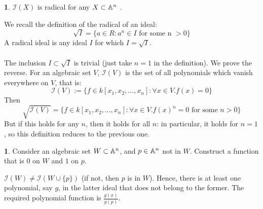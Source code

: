 \documentclass{book}
\newcommand{\I}[1]{\mathcal{I}(#1)}
\newcommand{\kn}{k[x_1,x_2,\ldots,x_n]}
\newcommand{\Af}{{\Bbb A}^n}
\theoremstyle{definition}
\theoremstyle{block}
\newtheorem{block*}[block]{}
\theoremstyle{thm}
\begin{document}
\begin{block*}$\I X$ is radical for any $X\subset\Af$ .\end{block*}
\noindent We recall the definition of the radical of an ideal:
\[\sqrt I = \{a\in R : a^n\in I \text{ for some n } > 0\}\]
A radical ideal is any ideal $I$ for which $I=\sqrt I$.\\\\
The inclusion $I\subset \sqrt I$ is trivial (just take $n=1$ in the definition).
We prove the reverse.
For an algebraic set $V$, $\I V$ is the set of all polynomials which vanish
everywhere on $V$, that is:
\[\I V:=\{f\in\kn : \forall x\in V. f(x) = 0\}\]
Then
\[\sqrt{\I V}=\{f\in\kn : \forall x\in V. f(x)^n = 0\text{ for some }n>0\}\]
But if this holds for any $n$, then it holds for all $n$: in particular, it
holds for $n=1$, so this definition reduces to the previous one.

\begin{block*}Consider an algebraic set $W\subset\Af$, and $p\in\Af$ not in $W$.
  Construct a function that is $0$ on $W$ and $1$ on $p$.\end{block*}
$\I W\neq\I{W\cup \{p\}}$ (if not, then $p$ is in $W$). Hence, there is at least
one polynomial, say $g$, in the latter ideal that does not belong to the former.
The required polynomial function is $\frac{g(x)}{g(p)}$.
\end{document}
